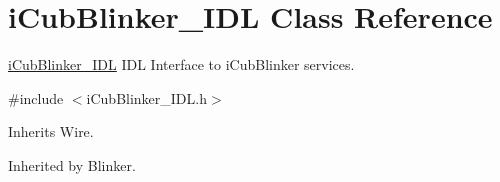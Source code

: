 \section{i\+Cub\+Blinker\+\_\+\+I\+D\+L Class Reference}
\label{classiCubBlinker__IDL}


\hyperlink{classiCubBlinker__IDL}{i\+Cub\+Blinker\+\_\+\+I\+D\+L} I\+D\+L Interface to i\+Cub\+Blinker services.  




{\ttfamily \#include $<$i\+Cub\+Blinker\+\_\+\+I\+D\+L.\+h$>$}



Inherits Wire.



Inherited by Blinker.

